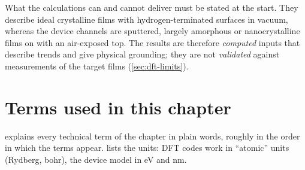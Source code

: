 What the calculations can and cannot deliver must be stated at the start. They describe ideal crystalline films with
hydrogen-terminated surfaces in vacuum, whereas the device channels are sputtered, largely amorphous or nanocrystalline
films on \AlO{} with an air-exposed top. The results are therefore \emph{computed} inputs that describe trends and
give physical grounding; they are not \emph{validated} against measurements of the target films (\cref{sec:dft-limits}).

\section{Terms used in this chapter}
\label{sec:dft-glossary}

 explains every technical term of the chapter in plain words, roughly in the order in which the
terms appear.  lists the units: DFT codes work in ``atomic'' units (Rydberg, bohr), the device
model in eV and nm.

